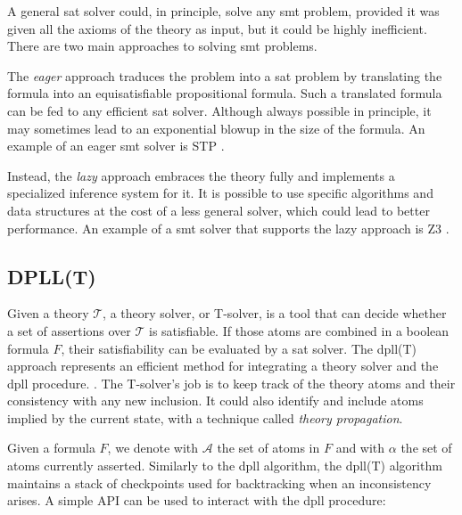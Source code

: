 A general \gls{sat} solver could, in principle, solve any \gls{smt} problem, provided it was given all the axioms of the theory as input, but it could be highly inefficient.
There are two main approaches to solving \gls{smt} problems.

The \textit{eager} approach traduces the problem into a \gls{sat} problem by translating the formula into an equisatisfiable propositional formula.
Such a translated formula can be fed to any efficient \gls{sat} solver.
Although always possible in principle, it may sometimes lead to an exponential blowup in the size of the formula.
An example of an eager \gls{smt} solver is STP \cite{repo:stp}.

Instead, the \textit{lazy} approach embraces the theory fully and implements a specialized inference system for it.
It is possible to use specific algorithms and data structures at the cost of a less general solver, which could lead to better performance.
An example of a \gls{smt} solver that supports the lazy approach is Z3 \cite{repo:z3}.

\subsection*{DPLL(T)}

Given a theory $\mathcal{T}$, a theory solver, or T-solver, is a tool that can decide whether a set of assertions over $\mathcal{T}$ is satisfiable.
If those atoms are combined in a boolean formula $F$, their satisfiability can be evaluated by a \gls{sat} solver.
The \gls{dpll}(T) approach represents an efficient method for integrating a theory solver and the \gls{dpll} procedure. \cite{paper:dpll-t}.
The T-solver's job is to keep track of the theory atoms and their consistency with any new inclusion.
It could also identify and include atoms implied by the current state, with a technique called \textit{theory propagation}.

Given a formula $F$, we denote with $\mathcal{A}$ the set of atoms in $F$ and with $\alpha$ the set of atoms currently asserted.
Similarly to the \gls{dpll} algorithm, the \gls{dpll}(T) algorithm maintains a stack of checkpoints used for backtracking when an inconsistency arises.
A simple API can be used to interact with the \gls{dpll} procedure:

